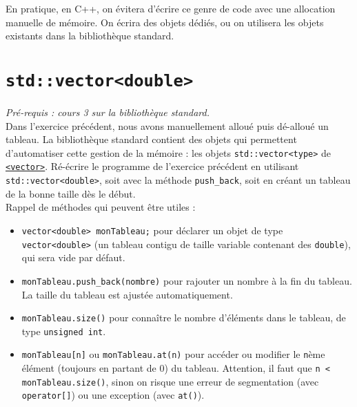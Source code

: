 \documentclass{book}
\newcommand{\inline}[1]{\texttt{#1}}
\begin{document}
En pratique, en C++, on évitera d'écrire ce genre de code avec une allocation manuelle de mémoire. On écrira des objets dédiés, ou on utilisera les objets existants dans la bibliothèque standard.


\section{\texttt{std::vector<double>}}

\emph{Pré-requis : cours 3 sur la bibliothèque standard.}\\

Dans l'exercice précédent, nous avons manuellement alloué puis dé-alloué un tableau. La bibliothèque standard contient des objets qui permettent d'automatiser cette gestion de la mémoire : les objets \inline{std::vector<type>} de \href{http://en.cppreference.com/w/cpp/header/vector}{\inline{<vector>}}. Ré-écrire le programme de l'exercice précédent en utilisant \inline{std::vector<double>}, soit avec la méthode \texttt{push\_back}, soit en créant un tableau de la bonne taille dès le début.\\

Rappel de méthodes qui peuvent être utiles :
\begin{itemize}
 \item \inline{vector<double> monTableau;} pour déclarer un objet de type \inline{vector<double>} (un tableau contigu de taille variable contenant des \inline{double}), qui sera vide par défaut.
 \item \inline{monTableau.push_back(nombre)} pour rajouter un nombre à la fin du tableau. La taille du tableau est ajustée automatiquement.
 \item \inline{monTableau.size()} pour connaître le nombre d'éléments dans le tableau, de type \inline{unsigned int}.
 \item \inline{monTableau[n]} ou \inline{monTableau.at(n)} pour accéder ou modifier le \texttt{n}ème élément (toujours en partant de 0) du tableau. Attention, il faut que \inline{n < monTableau.size()}, sinon on risque une erreur de segmentation (avec \inline{operator[]}) ou une exception (avec \inline{at()}).
\end{itemize}
\end{document}
